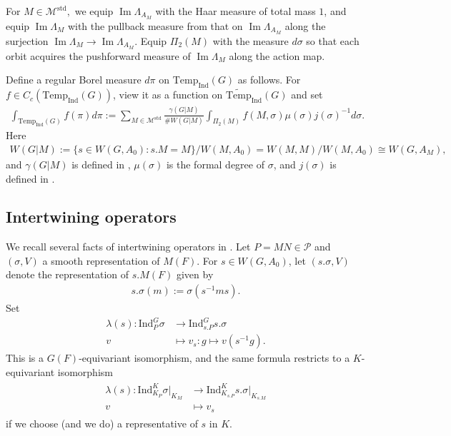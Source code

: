 \documentclass[10pt]{amsart}
\theoremstyle{definition}
\numberwithin{equation}{section}
\numberwithin{equation}{subsection}
\newcommand{\Ind}{\mathrm{Ind}}
\newcommand{\Temp}{\mathrm{Temp}}
\renewcommand{\Im}{\mathop{\mathrm{Im}}}
\begin{document}
For $M\in \mathcal{M}^{\mathrm{std}},$ we equip $\Im\Lambda_{A_M}$ with the Haar measure of total mass $1$, and equip $\Im\Lambda_M$ with the pullback measure from that on $\Im\Lambda_{A_M}$ along the surjection $\Im\Lambda_{M}\to\Im\Lambda_{A_M}$. Equip $\Pi_2(M)$ with the measure $d\sigma$ so that each orbit acquires the pushforward measure of $\Im\Lambda_M$ along the action map. 

Define a regular Borel measure $d\pi$ on $\Temp_\Ind(G)$ as follows. For $f\in C_c(\Temp_\Ind(G))$, view it as a function on $\widetilde{\Temp}_\Ind(G)$ and set
\begin{align*}
    \int_{\Temp_\Ind(G)} f(\pi) d\pi := \sum_{M\in\mathcal{M}^{\mathrm{std}}} \frac{\gamma(G|M)}{\#W(G|M)} \int_{\Pi_2(M)} f(M,\sigma) \mu(\sigma)j(\sigma)^{-1} d\sigma.
\end{align*}
Here 
\begin{align*}
    W(G|M):=\{s\in W(G,A_0):s. M=M\}/W(M,A_0)=W(M,M)/W(M,A_0)\cong W(G,A_M),
\end{align*}
and $\gamma(G|M)$ is defined in \cite[p.241]{Waldspurger:Plancherel}, $\mu(\sigma)$ is the formal degree of $\sigma$, and $j(\sigma)$ is defined in \cite[p.285]{Waldspurger:Plancherel}.

\subsection{Intertwining operators}\label{subsec:intertwining:recall} We recall several facts of intertwining operators in \cite{Waldspurger:Plancherel}. Let $P=MN\in \mathcal{P}$ and $(\sigma,V)$ a smooth representation of $M(F)$. For $s\in W(G,A_0)$, let $(s.\sigma,V)$ denote the representation of $s.M(F)$ given by 
\begin{align*}
    s.\sigma(m) := \sigma(s^{-1}ms).
\end{align*}
Set
\begin{align*}%
\lambda(s):\Ind_{P}^G \sigma &\longrightarrow \Ind_{s.P}^{G} s.\sigma\\
    v&\longmapsto v_s:g\mapsto v(s^{-1}g).
\end{align*}
This is a $G(F)$-equivariant isomorphism, and the same formula restricts to a $K$-equivariant isomorphism
\begin{align}\label{leftW}
\begin{split}
    \lambda(s):\Ind_{K_P}^K \sigma\vert_{K_M}&\longrightarrow \Ind_{K_{s.P}}^{K} s.\sigma\vert_{K_{s.M}}\\
    v&\mapsto v_s
\end{split}
\end{align}
if we choose (and we do) a representative of $s$ in $K$.
\end{document}
